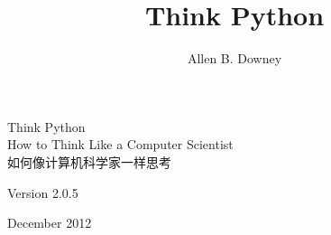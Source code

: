 \documentclass[10pt]{book}
\title{Think Python}
\author{Allen B. Downey}
\newcommand{\theversion}{2.0.5}
\newcommand{\thedate}{December 2012}
\newif\ifplastex
\begin{document}
\begin{CJK}{UTF8}{gbsn}

\frontmatter

\ifplastex
    \usepackage{localdef}
    \maketitle

\newcount\anchorcnt
\newcommand*{\Anchor}[1]{%
  \@bsphack%
    \Hy@GlobalStepCount\anchorcnt%
    \edef\@currentHref{anchor.\the\anchorcnt}%
    \Hy@raisedlink{\hyper@anchorstart{\@currentHref}\hyper@anchorend}%
    \M@gettitle{}\label{#1}%
    \@esphack%
}


\else

\newtheorem{exercise}{Exercise}[chapter]




\begin{latexonly}

\renewcommand{\blankpage}{\thispagestyle{empty} \quad \newpage}



\thispagestyle{empty}

\begin{flushright}
\vspace*{2.0in}

\begin{spacing}{3}
{\huge Think Python}\\
{\Large How to Think Like a Computer Scientist \\
如何像计算机科学家一样思考}
\end{spacing}

\vspace{0.25in}

Version \theversion

\thedate

\vfill

\end{flushright}


\blankpage
\blankpage

\pagebreak
\thispagestyle{empty}


\end{latexonly}
\end{CJK}
\end{document}
